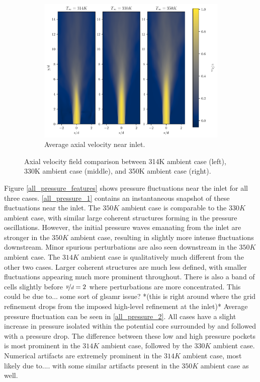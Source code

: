 \begin{figure}[H]
\begin{subfigure}{0.5\textwidth}
	\includegraphics[scale=.45]{figures/Plots/vertical/v_scaled_vert_avg_all_zoom.pdf}
	\caption{Average axial velocity near inlet.} \label{all_v_3}
\end{subfigure}
\caption{Axial velocity field comparison between 314K ambient case (left), 330K ambient case (middle), and 350K ambient case (right).}
\label{all_v_features}
\end{figure}

Figure \ref{all_pressure_features} shows pressure fluctuations near the inlet for all three cases. \ref{all_pressure_1} contains an instantaneous snapshot of these fluctuations near the inlet. The $350 K$ ambient case is comparable to the $330 K$ ambient case, with similar large coherent structures forming in the pressure oscillations. However, the initial pressure waves emanating from the inlet are stronger in the $350 K$ ambient case, resulting in slightly more intense fluctuations downstream. Minor spurious perturbations are also seen downstream in the $350 K$ ambient case. The $314 K$ ambient case is qualitatively much different from the other two cases. Larger coherent structures are much less defined, with smaller fluctuations appearing much more prominent throughout. There is also a band of cells slightly before $\nicefrac{y}{d}=2$ where perturbations are more concentrated. This could be due to... some sort of gls{amr} issue? *(this is right around where the grid refinement drops from the imposed high-level refinement at the inlet)* Average pressure fluctuation can be seen in \ref{all_pressure_2}. All cases have a slight increase in pressure isolated within the potential core surrounded by and followed with a pressure drop. The difference between these low and high pressure pockets is most prominent in the $314 K$ ambient case, followed by the $330 K$ ambient case. Numerical artifacts are extremely prominent in the $314 K$ ambient case, most likely due to.... with some similar artifacts present in the $350 K$ ambient case as well.  

